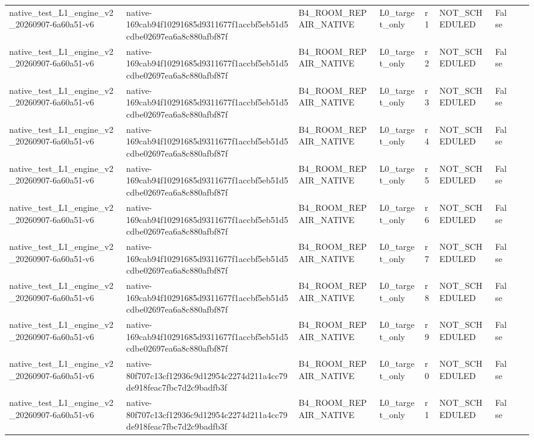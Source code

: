 \begin{tabular}{lllllllll}
native\_test\_L1\_engine\_v2\_20260907-6a60a51-v6 & native-169cab94f10291685d9311677f1accbf5eb51d5cdbe02697ea6a8c880afbf87f & B4\_ROOM\_REPAIR\_NATIVE & L0\_target\_only & r1 & NOT\_SCHEDULED & False &  &  \\
native\_test\_L1\_engine\_v2\_20260907-6a60a51-v6 & native-169cab94f10291685d9311677f1accbf5eb51d5cdbe02697ea6a8c880afbf87f & B4\_ROOM\_REPAIR\_NATIVE & L0\_target\_only & r2 & NOT\_SCHEDULED & False &  &  \\
native\_test\_L1\_engine\_v2\_20260907-6a60a51-v6 & native-169cab94f10291685d9311677f1accbf5eb51d5cdbe02697ea6a8c880afbf87f & B4\_ROOM\_REPAIR\_NATIVE & L0\_target\_only & r3 & NOT\_SCHEDULED & False &  &  \\
native\_test\_L1\_engine\_v2\_20260907-6a60a51-v6 & native-169cab94f10291685d9311677f1accbf5eb51d5cdbe02697ea6a8c880afbf87f & B4\_ROOM\_REPAIR\_NATIVE & L0\_target\_only & r4 & NOT\_SCHEDULED & False &  &  \\
native\_test\_L1\_engine\_v2\_20260907-6a60a51-v6 & native-169cab94f10291685d9311677f1accbf5eb51d5cdbe02697ea6a8c880afbf87f & B4\_ROOM\_REPAIR\_NATIVE & L0\_target\_only & r5 & NOT\_SCHEDULED & False &  &  \\
native\_test\_L1\_engine\_v2\_20260907-6a60a51-v6 & native-169cab94f10291685d9311677f1accbf5eb51d5cdbe02697ea6a8c880afbf87f & B4\_ROOM\_REPAIR\_NATIVE & L0\_target\_only & r6 & NOT\_SCHEDULED & False &  &  \\
native\_test\_L1\_engine\_v2\_20260907-6a60a51-v6 & native-169cab94f10291685d9311677f1accbf5eb51d5cdbe02697ea6a8c880afbf87f & B4\_ROOM\_REPAIR\_NATIVE & L0\_target\_only & r7 & NOT\_SCHEDULED & False &  &  \\
native\_test\_L1\_engine\_v2\_20260907-6a60a51-v6 & native-169cab94f10291685d9311677f1accbf5eb51d5cdbe02697ea6a8c880afbf87f & B4\_ROOM\_REPAIR\_NATIVE & L0\_target\_only & r8 & NOT\_SCHEDULED & False &  &  \\
native\_test\_L1\_engine\_v2\_20260907-6a60a51-v6 & native-169cab94f10291685d9311677f1accbf5eb51d5cdbe02697ea6a8c880afbf87f & B4\_ROOM\_REPAIR\_NATIVE & L0\_target\_only & r9 & NOT\_SCHEDULED & False &  &  \\
native\_test\_L1\_engine\_v2\_20260907-6a60a51-v6 & native-80f707c13cf12936c9d12954c2274d211a4cc79de918feac7fbc7d2c9badfb3f & B4\_ROOM\_REPAIR\_NATIVE & L0\_target\_only & r0 & NOT\_SCHEDULED & False &  &  \\
native\_test\_L1\_engine\_v2\_20260907-6a60a51-v6 & native-80f707c13cf12936c9d12954c2274d211a4cc79de918feac7fbc7d2c9badfb3f & B4\_ROOM\_REPAIR\_NATIVE & L0\_target\_only & r1 & NOT\_SCHEDULED & False &  &  \\

\end{tabular}
